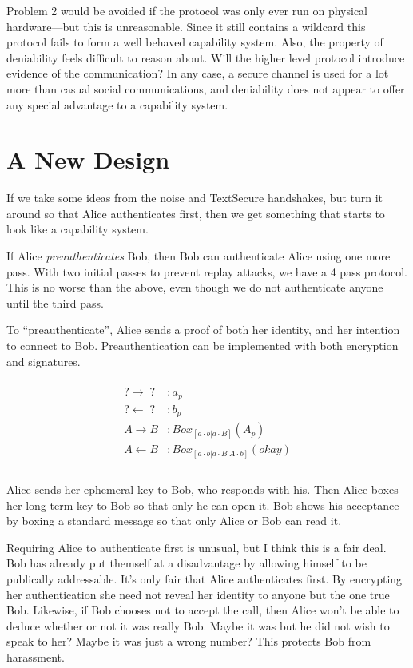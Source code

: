 \documentclass[12pt]{article}
\begin{document}
Problem 2 would be avoided if the protocol was only ever run on
physical hardware---but this is unreasonable.
Since it still contains a wildcard this protocol
fails to form a well behaved capability system. Also, the property
of deniability feels difficult to reason about. Will the higher level
protocol introduce evidence of the communication? In any case, a secure
channel is used for a lot more than casual social communications,
and deniability does not appear to offer any special advantage
to a capability system.

\section{A New Design}

If we take some ideas from the noise and TextSecure handshakes,
but turn it around so that Alice authenticates first,
then we get something that starts to look like a capability system.

If Alice \emph{preauthenticates} Bob, then Bob can authenticate
Alice using one more pass. With two initial passes to prevent
replay attacks, we have a 4 pass protocol. This is no worse
than the above, even though we do not authenticate anyone
until the third pass.

To ``preauthenticate'', Alice sends a proof of both her identity,
and her intention to connect to Bob. Preauthentication can be
implemented with both encryption and signatures.

$$
\begin{align*}
\\
    ? \to \;?\; &: a_p  \\
    ? \gets \;?\; &: b_p \\
    A \to B &: Box_{[a \cdot b | a \cdot B]}(A_p) \\
    A \gets B &: Box_{[a \cdot b | a \cdot B | A \cdot b]}(okay)\\
\\
\end{align*}
$$

Alice sends her ephemeral key to Bob, who responds with his.
Then Alice boxes her long term key to Bob so that only he can open it.
Bob shows his acceptance by boxing a standard message
so that only Alice or Bob can read it.

Requiring Alice to authenticate first is unusual, but
I think this is a fair deal. Bob has already put themself
at a disadvantage by allowing himself to be publically
addressable. It's only fair that Alice authenticates first.
By encrypting her authentication she need not reveal her
identity to anyone but the one true Bob. Likewise, if Bob chooses
not to accept the call, then Alice won't be able to deduce
whether or not it was really Bob. Maybe it was but he did not wish
to speak to her? Maybe it was just a wrong number? This protects
Bob from harassment.
\end{document}
